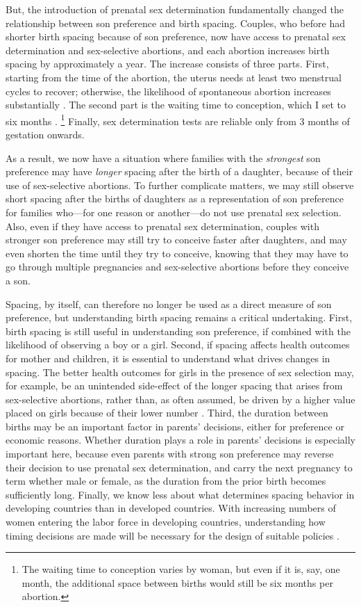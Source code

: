 \documentclass[12pt,letterpaper]{article}
\begin{document}
But, the introduction of prenatal sex determination fundamentally changed the 
relationship between son preference and birth spacing.
Couples, who before had shorter birth spacing because of son preference,
now have access to prenatal sex determination and sex-selective abortions,
and each abortion increases birth spacing by approximately a year.
The increase consists of three parts.
First, starting from the time of the abortion, the uterus needs at 
least two menstrual cycles to recover;  otherwise, the likelihood 
of spontaneous abortion increases substantially \citep{zhou00b}.
The second part is the waiting time to conception, which I set to six 
months \citep{Wang2003}.%
\footnote{
The waiting time to conception varies by woman, but even if it is, say, one 
month, the additional space between births would still be six months per abortion.
}
Finally, sex determination tests are reliable only from 3 months 
of gestation onwards.

As a result, we now have a situation where families with the 
\emph{strongest} son preference may have \emph{longer} spacing after 
the birth of a daughter,
because of their use of sex-selective abortions.
To further complicate matters, we may still observe short spacing 
after the births of daughters as a representation of son preference for 
families who---for one reason or another---do not use prenatal sex selection.
Also, even if they have access to prenatal sex determination, couples 
with stronger son preference may still try to conceive faster after daughters, 
and may even shorten the time until they try to conceive, knowing that 
they may have to go through multiple pregnancies and sex-selective
abortions before they conceive a son.

Spacing, by itself, can therefore no longer be used as a direct measure of 
son preference, but understanding birth spacing remains a critical undertaking.
First, birth spacing is still useful in understanding son preference, 
if combined with the likelihood of observing a boy or a girl.
Second, if spacing affects health outcomes for mother and children, it is 
essential to understand what drives changes in spacing.
The better health outcomes for girls in the presence of sex selection may,
for example, be an unintended side-effect of the longer spacing that arises
from sex-selective abortions, rather than, as often assumed, be driven by a 
higher value placed on girls because of their lower number \citep{Lin2014,Hu2015}.
Third, the duration between births may be an important factor in parents' 
decisions, either for preference or economic reasons.
Whether duration plays a role in parents' decisions is especially important 
here, because even parents with strong son preference may reverse their 
decision to use prenatal sex determination, and carry the next pregnancy 
to term whether male or female, as the duration from the prior birth 
becomes sufficiently long.
Finally, we know less about what determines spacing behavior in 
developing countries than in developed countries.
With increasing numbers of women entering the labor force in developing
countries, understanding how timing decisions are made will be necessary
for the design of suitable policies \citep{Portner2018}.
\end{document}
